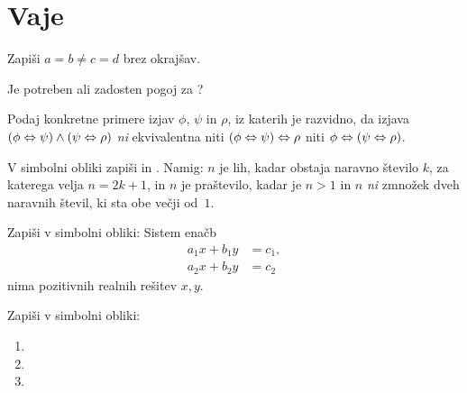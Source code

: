 \section{Vaje}

\begin{vaja}
  Zapiši $a = b \neq c = d$ brez okrajšav.
\end{vaja}

\begin{vaja}
  Je  potreben ali zadosten
  pogoj za ?
\end{vaja}

\begin{vaja}
  Podaj konkretne primere izjav $\phi$, $\psi$ in $\rho$, iz katerih
  je razvidno, da izjava $(\phi \Leftrightarrow \psi) \land (\psi \Leftrightarrow \rho)$
  \emph{ni} ekvivalentna niti $(\phi \Leftrightarrow \psi) \Leftrightarrow \rho$ niti
  $\phi \Leftrightarrow (\psi \Leftrightarrow \rho)$.
\end{vaja}

\begin{vaja}
  V simbolni obliki zapiši  in .
  Namig: $n$ je lih, kadar obstaja naravno število $k$, za katerega
  velja $n = 2 k + 1$, in $n$ je praštevilo, kadar je $n > 1$ in $n$ \emph{ni} zmnožek
  dveh naravnih števil, ki sta obe večji od~$1$.
\end{vaja}

\begin{vaja}
  Zapiši v simbolni obliki: Sistem enačb
  \begin{align*}
    a_1 x + b_1 y &= c_1,\\
    a_2 x + b_2 y &= c_2
  \end{align*}
  nima pozitivnih realnih rešitev $x, y$.
\end{vaja}

\begin{vaja}
  Zapiši v simbolni obliki:
  \begin{enumerate}
  \item {}
  \item {}
  \item {}
  \end{enumerate}
\end{vaja}

